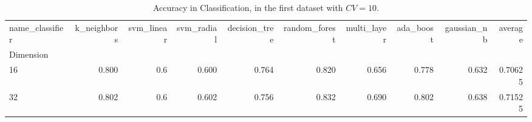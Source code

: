 \begin{table}
\centering
\caption{Accuracy in Classification, in the first dataset with $CV=10$.}
\label{metrics_boon_cv_10}
\begin{tabular}{lrrrrrrrrr}
\toprule
name\_classifier &  k\_neighbors &  svm\_linear &  svm\_radial &  decision\_tree &  random\_forest &  multi\_layer &  ada\_boost &  gaussian\_nb &  average \\
Dimension &              &             &             &                &                &              &            &              &          \\
\midrule
16        &        0.800 &         0.6 &       0.600 &          0.764 &          0.820 &        0.656 &      0.778 &        0.632 &  0.70625 \\
32        &        0.802 &         0.6 &       0.602 &          0.756 &          0.832 &        0.690 &      0.802 &        0.638 &  0.71525 \\
\bottomrule
\end{tabular}
\end{table}
